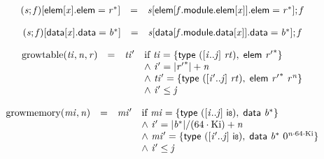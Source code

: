 $$
\begin{array}{@{}lcl@{}l@{}}
({\mathit{s}} ; {\mathit{f}}){}[\mathsf{elem}{}[{\mathit{x}}].\mathsf{elem} = {{\mathit{r}}^\ast}] &=& {\mathit{s}}{}[\mathsf{elem}{}[{\mathit{f}}.\mathsf{module}.\mathsf{elem}{}[{\mathit{x}}]].\mathsf{elem} = {{\mathit{r}}^\ast}] ; {\mathit{f}} &  \\
\end{array}
$$

$$
\begin{array}{@{}lcl@{}l@{}}
({\mathit{s}} ; {\mathit{f}}){}[\mathsf{data}{}[{\mathit{x}}].\mathsf{data} = {{\mathit{b}}^\ast}] &=& {\mathit{s}}{}[\mathsf{data}{}[{\mathit{f}}.\mathsf{module}.\mathsf{data}{}[{\mathit{x}}]].\mathsf{data} = {{\mathit{b}}^\ast}] ; {\mathit{f}} &  \\
\end{array}
$$

\vspace{1ex}

$$
\begin{array}{@{}lcl@{}l@{}}
{\mathrm{growtable}}({\mathit{ti}}, {\mathit{n}}, {\mathit{r}}) &=& {\mathit{ti}'} &\quad
  \mbox{if}~{\mathit{ti}} = \{ \begin{array}[t]{@{}l@{}}
\mathsf{type}~({}[{\mathit{i}} .. {\mathit{j}}]~{\mathit{rt}}),\; \mathsf{elem}~{{\mathit{r}'}^\ast} \}\end{array} \\
 &&&\quad {\land}~{\mathit{i}'} = {|{{\mathit{r}'}^\ast}|} + {\mathit{n}} \\
 &&&\quad {\land}~{\mathit{ti}'} = \{ \begin{array}[t]{@{}l@{}}
\mathsf{type}~({}[{\mathit{i}'} .. {\mathit{j}}]~{\mathit{rt}}),\; \mathsf{elem}~{{\mathit{r}'}^\ast}~{{\mathit{r}}^{{\mathit{n}}}} \}\end{array} \\
 &&&\quad {\land}~{\mathit{i}'} \leq {\mathit{j}} \\
\end{array}
$$

$$
\begin{array}{@{}lcl@{}l@{}}
{\mathrm{growmemory}}({\mathit{mi}}, {\mathit{n}}) &=& {\mathit{mi}'} &\quad
  \mbox{if}~{\mathit{mi}} = \{ \begin{array}[t]{@{}l@{}}
\mathsf{type}~({}[{\mathit{i}} .. {\mathit{j}}]~\mathsf{i{\scriptstyle8}}),\; \mathsf{data}~{{\mathit{b}}^\ast} \}\end{array} \\
 &&&\quad {\land}~{\mathit{i}'} = {|{{\mathit{b}}^\ast}|} / (64 \cdot {\mathrm{Ki}}) + {\mathit{n}} \\
 &&&\quad {\land}~{\mathit{mi}'} = \{ \begin{array}[t]{@{}l@{}}
\mathsf{type}~({}[{\mathit{i}'} .. {\mathit{j}}]~\mathsf{i{\scriptstyle8}}),\; \mathsf{data}~{{\mathit{b}}^\ast}~{0^{{\mathit{n}} \cdot 64 \cdot {\mathrm{Ki}}}} \}\end{array} \\
 &&&\quad {\land}~{\mathit{i}'} \leq {\mathit{j}} \\
\end{array}
$$

